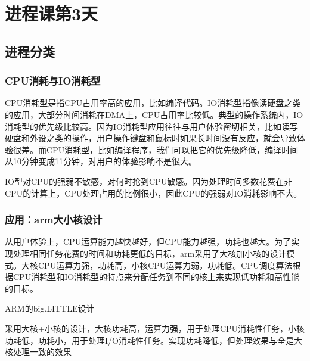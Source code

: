 
\part{进程课第3天}


\chapter{进程分类}


\section{CPU消耗与IO消耗型}
CPU消耗型是指CPU占用率高的应用，比如编译代码。IO消耗型指像读硬盘之类的应用，大部分时间消耗在DMA上，CPU占用率比较低。典型的操作系统内，IO消耗型的优先级比较高。因为IO消耗型应用往往与用户体验密切相关，比如读写硬盘和外设之类的操作，用户操作键盘和鼠标时如果长时间没有反应，就会导致体验很差。而CPU消耗型，比如编译程序，我们可以把它的优先级降低，编译时间从10分钟变成11分钟，对用户的体验影响不是很大。

IO型对CPU的强弱不敏感，对何时抢到CPU敏感。因为处理时间多数花费在非CPU的计算上，CPU处理占用的比例很小，因此CPU的强弱对IO消耗影响不大。

\section{应用：arm大小核设计}
从用户体验上，CPU运算能力越快越好，但CPU能力越强，功耗也越大。为了实现处理相同任务花费的时间和功耗更低的目标，arm采用了大核加小核的设计模式。大核CPU运算力强，功耗高，小核CPU运算力弱，功耗低。CPU调度算法根据CPU消耗型和IO消耗型的特点来分配任务到不同的核上来实现低功耗和高性能的目标。
\begin{example*}
  \wdexpbox
  {\caption{ARM的big.LITTLE设计}}
  {采用大核+小核的设计，大核功耗高，运算力强，用于处理CPU消耗性任务，小核功耗低，功耗小，用于处理I/O消耗性任务。实现功耗降低，但处理效果与全是大核处理一致的效果}
\end{example*}


